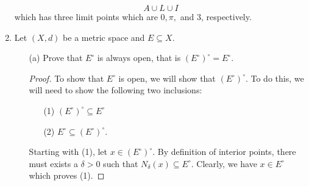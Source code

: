 \documentclass[a4paper]{article}
\begin{document}
\begin{enumerate}
\begin{solution}
                \[  A \cup L \cup I   \]
                which has three limit points which are \( 0, \pi,  \) and \( 3  \), respectively.
            \end{solution}
        \item Let \( (X,d)  \) be a metric space and \( E \subseteq X  \).
            \begin{enumerate}
                \item[(a)] Prove that \( E^{\circ} \) is always open, that is \( (E^{\circ})^{\circ} = E^{\circ} \).
                    \begin{proof}
                    To show that \( E^{\circ} \) is open, we will show that \( (E^{\circ})^{\circ} \). To do this, we will need to show the following two inclusions:
                    \begin{enumerate}
                        \item[(1)] \( (E^{\circ})^{\circ} \subseteq E^{\circ} \)
                        \item[(2)] \( E^{\circ} \subseteq (E^{\circ})^{\circ} \).
                    \end{enumerate}
                    Starting with (1), let \( x \in (E^{\circ})^{\circ} \). By definition of interior points, there must exists a \( \delta > 0  \) such that \( {N}_{\delta}(x) \subseteq  E^{\circ} \). Clearly, we have \( x \in E^{\circ} \) which proves (1).   


\end{proof}
\end{enumerate}
\end{enumerate}
\end{document}
